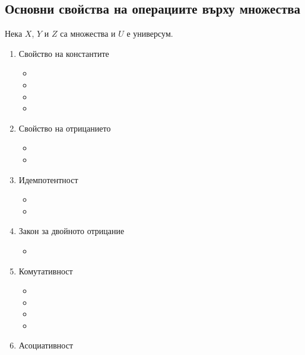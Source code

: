 \subsection{Основни свойства на операциите върху множества}
Нека \(X\), \(Y\) и \(Z\) са множества и \(U\) е универсум.

\begin{enumerate}
    \item Свойство на константите
        \begin{itemize}
            \item {}
            \item {}
            \item {}
            \item {}
        \end{itemize}
    \item Свойство на отрицанието
        \begin{itemize}
            \item {}
            \item {}
        \end{itemize}
    \item Идемпотентност
        \begin{itemize}
            \item {}
            \item {}
        \end{itemize}
    \item Закон за двойното отрицание
        \begin{itemize}
            \item {}
        \end{itemize}
    \item Комутативност
        \begin{itemize}
            \item {}
            \item {}
            \item {}
            \item {}
        \end{itemize}
    \item Асоциативност
        \begin{itemize}

\end{itemize}
\end{enumerate}
